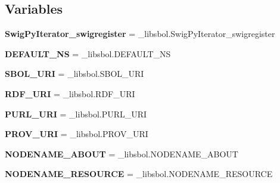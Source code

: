 \subsection*{Variables}
\begin{DoxyCompactItemize}
\item 
{\bfseries Swig\+Py\+Iterator\+\_\+swigregister} = \+\_\+libsbol.\+Swig\+Py\+Iterator\+\_\+swigregister\hypertarget{namespacesbol_1_1libsbol_af7257e39d96aec5b20e16688714784e2}{}\label{namespacesbol_1_1libsbol_af7257e39d96aec5b20e16688714784e2}

\item 
{\bfseries D\+E\+F\+A\+U\+L\+T\+\_\+\+NS} = \+\_\+libsbol.\+D\+E\+F\+A\+U\+L\+T\+\_\+\+NS\hypertarget{namespacesbol_1_1libsbol_a44b28094dc359c2772420e28a7c6e132}{}\label{namespacesbol_1_1libsbol_a44b28094dc359c2772420e28a7c6e132}

\item 
{\bfseries S\+B\+O\+L\+\_\+\+U\+RI} = \+\_\+libsbol.\+S\+B\+O\+L\+\_\+\+U\+RI\hypertarget{namespacesbol_1_1libsbol_af9a579d4da79c412cb6c574bd465bf28}{}\label{namespacesbol_1_1libsbol_af9a579d4da79c412cb6c574bd465bf28}

\item 
{\bfseries R\+D\+F\+\_\+\+U\+RI} = \+\_\+libsbol.\+R\+D\+F\+\_\+\+U\+RI\hypertarget{namespacesbol_1_1libsbol_a8b099fe079b8c04f7a3d33d92cf10c13}{}\label{namespacesbol_1_1libsbol_a8b099fe079b8c04f7a3d33d92cf10c13}

\item 
{\bfseries P\+U\+R\+L\+\_\+\+U\+RI} = \+\_\+libsbol.\+P\+U\+R\+L\+\_\+\+U\+RI\hypertarget{namespacesbol_1_1libsbol_a423632c84a6b96f54537f6c98656d170}{}\label{namespacesbol_1_1libsbol_a423632c84a6b96f54537f6c98656d170}

\item 
{\bfseries P\+R\+O\+V\+\_\+\+U\+RI} = \+\_\+libsbol.\+P\+R\+O\+V\+\_\+\+U\+RI\hypertarget{namespacesbol_1_1libsbol_a5f960bca2262bcd2b0e17a62fa6638cc}{}\label{namespacesbol_1_1libsbol_a5f960bca2262bcd2b0e17a62fa6638cc}

\item 
{\bfseries N\+O\+D\+E\+N\+A\+M\+E\+\_\+\+A\+B\+O\+UT} = \+\_\+libsbol.\+N\+O\+D\+E\+N\+A\+M\+E\+\_\+\+A\+B\+O\+UT\hypertarget{namespacesbol_1_1libsbol_aa14bc4fc065d88db89965f35286067d4}{}\label{namespacesbol_1_1libsbol_aa14bc4fc065d88db89965f35286067d4}

\item 
{\bfseries N\+O\+D\+E\+N\+A\+M\+E\+\_\+\+R\+E\+S\+O\+U\+R\+CE} = \+\_\+libsbol.\+N\+O\+D\+E\+N\+A\+M\+E\+\_\+\+R\+E\+S\+O\+U\+R\+CE\hypertarget{namespacesbol_1_1libsbol_a21d9de9d7bf8a69542f753996d453a50}{}\label{namespacesbol_1_1libsbol_a21d9de9d7bf8a69542f753996d453a50}


\end{DoxyCompactItemize}
